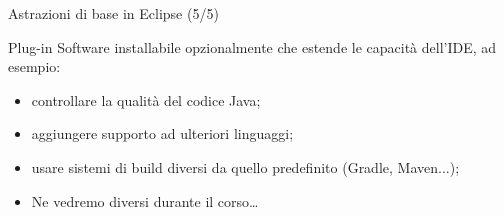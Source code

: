\documentclass[xcolor=dvipsnames,presentation]{beamer}
\begin{document}
\begin{frame}{Astrazioni di base in Eclipse (5/5)}
\begin{block}{Plug-in}
Software installabile opzionalmente che estende le capacità dell'IDE, ad esempio:
\begin{itemize}
\item controllare la qualità del codice Java;
\item aggiungere supporto ad ulteriori linguaggi;
\item usare sistemi di build diversi da quello predefinito (Gradle, Maven...);
\end{itemize}
\end{block}

\begin{itemize}
\item Ne vedremo diversi durante il corso\dots
\end{itemize}
\end{frame}
\end{document}
